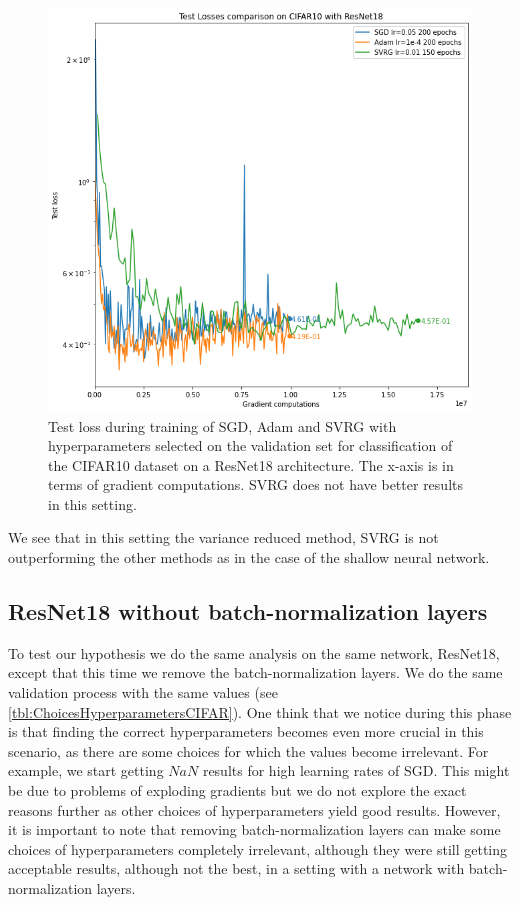 \documentclass[a4paper,11pt,oneside]{report}
\begin{document}
\begin{figure}
    \centering
    \includegraphics[width=\columnwidth]{figures/ResNet18Results.png}
    \caption{Test loss during training of SGD, Adam and SVRG with hyperparameters selected on the validation set for classification of the CIFAR10 dataset on a ResNet18 architecture. The x-axis is in terms of gradient computations. SVRG does not have better results in this setting.}
    \label{fig:ResNet18results}
\end{figure}

We see that in this setting the variance reduced method, SVRG is not outperforming the other methods as in the case of the shallow neural network. 

\subsection{ResNet18 without batch-normalization layers}

To test our hypothesis we do the same analysis on the same network, ResNet18, except that this time we remove the batch-normalization layers. We do the same validation process with the same values (see \autoref{tbl:ChoicesHyperparametersCIFAR}). One think that we notice during this phase is that finding the correct hyperparameters becomes even more crucial in this scenario, as there are some choices for which the values become irrelevant. For example, we start getting $NaN$ results for high learning rates of SGD. This might be due to problems of exploding gradients but we do not explore the exact reasons further as other choices of hyperparameters yield good results. However, it is important to note that removing batch-normalization layers can make some choices of hyperparameters completely irrelevant, although they were still getting acceptable results, although not the best, in a setting with a network with batch-normalization layers.
\end{document}
